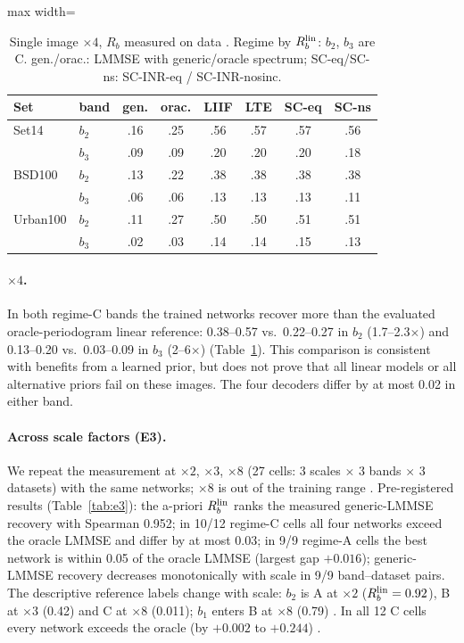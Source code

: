 \begin{table}[t]\centering\small
\caption{Single image $\times4$, $R_b$ measured on data
. Regime by $R_b^{\mathrm{lin}}$: $b_2$, $b_3$ are C. gen./orac.: LMMSE with generic/oracle spectrum; SC-eq/SC-ns: SC-INR-eq / SC-INR-nosinc.}
\label{tab:h6c}
\setlength{\tabcolsep}{3pt}
\begin{adjustbox}{max width=\linewidth}\begin{tabular}{llcccccc}\toprule
Set & band & gen. & orac. & LIIF & LTE & SC-eq & SC-ns\\\midrule
Set14 & $b_2$ & .16 & .25 & .56 & .57 & .57 & .56\\
 & $b_3$ & .09 & .09 & .20 & .20 & .20 & .18\\
BSD100 & $b_2$ & .13 & .22 & .38 & .38 & .38 & .38\\
 & $b_3$ & .06 & .06 & .13 & .13 & .13 & .11\\
Urban100 & $b_2$ & .11 & .27 & .50 & .50 & .51 & .51\\
 & $b_3$ & .02 & .03 & .14 & .14 & .15 & .13\\
\bottomrule\end{tabular}\end{adjustbox}
\end{table}

\paragraph{$\times4$.} In both regime-C bands the trained networks recover
more than the evaluated oracle-periodogram linear reference: 0.38--0.57 vs.\ 0.22--0.27 in $b_2$
(1.7--2.3$\times$) and 0.13--0.20 vs.\ 0.03--0.09 in $b_3$ (2--6$\times$)
(Table~\ref{tab:h6c}). This comparison is consistent with benefits from a learned prior, but does not prove that all linear models or all alternative priors fail on these images.
The four decoders differ by at most 0.02 in either band.

\paragraph{Across scale factors (E3).} We repeat the measurement at
$\times2$, $\times3$, $\times8$ (27 cells: 3 scales $\times$ 3 bands $\times$
3 datasets) with the same networks; $\times8$ is out of the training range
. Pre-registered results (Table~\ref{tab:e3}): the a-priori
$R_b^{\mathrm{lin}}$ ranks the measured generic-LMMSE recovery with Spearman 0.952; in
10/12 regime-C cells all four networks exceed the oracle LMMSE and differ by
at most 0.03; in 9/9 regime-A cells the best network is within 0.05 of the
oracle LMMSE (largest gap $+0.016$); generic-LMMSE recovery decreases
monotonically with scale in 9/9 band--dataset pairs. The descriptive reference labels change with scale: $b_2$ is A at $\times2$ ($R_b^{\mathrm{lin}}=0.92$), B at $\times3$ (0.42) and
C at $\times8$ (0.011); $b_1$ enters B at $\times8$ (0.79)
. In all 12 C cells every network exceeds the oracle
(by $+0.002$ to $+0.244$) .

